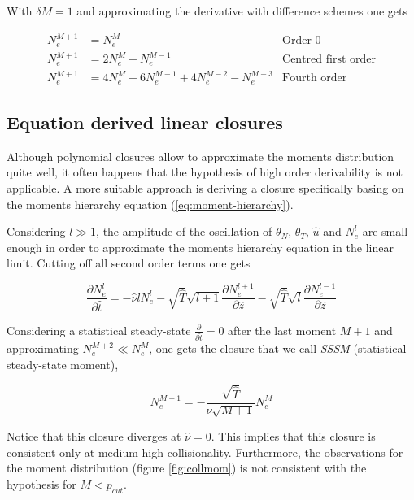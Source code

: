 \documentclass[final]{jpp}
\begin{document}
With $\delta M = 1$ and approximating the derivative with difference schemes one gets

\begin{align}
N_e^{M+1} &= N_e^M & \text{Order 0} \\
N_e^{M+1} &= 2 N_e^M - N_e^{M-1} & \text{Centred first order} \\
N_e^{M+1} &= 4 N_e^M - 6 N_e^{M-1} + 4 N_e^{M-2} - N_e^{M-3} & \text{Fourth order}
\end{align}

\subsection{Equation derived linear closures}

Although polynomial closures allow to approximate the moments distribution quite well, it often happens that the hypothesis of high order derivability is not applicable. A more suitable approach is deriving a closure specifically basing on the moments hierarchy equation (\ref{eq:moment-hierarchy}).

Considering $l \gg 1$, the amplitude of the  oscillation of $\theta_N$, $\theta_T$, $\hat{u}$ and $N_e^l$ are small enough in order to approximate the moments hierarchy equation in the linear limit. Cutting off all second order terms one gets

\begin{equation} \label{eq:linearmom}
\frac{\partial N_e^l}{\partial \hat{t}} = - \hat{\nu} l N_e^l - \sqrt{\hat{T}} \sqrt{l+1} \frac{\partial N_e^{l+1}}{\partial \hat{z}} - \sqrt{\hat{T}} \sqrt{l} \frac{\partial N_e^{l-1}}{\partial \hat{z}} 
\end{equation}

Considering a statistical steady-state $\frac{\partial}{\partial \hat{t}} = 0$ after the last moment $M+1$ and approximating $N_e^{M+2} \ll N_e^M$, one gets the closure that we call \textit{SSSM} (statistical steady-state moment),

\begin{equation} \label{eq:sssm}
N_e^{M+1} = - \frac{ \sqrt{\hat{T}} }{ \hat{\nu} \sqrt{M+1} } N_e^M 
\end{equation}

Notice that this closure diverges at $\hat{\nu} = 0$. This implies that this closure is consistent only at medium-high collisionality. Furthermore, the observations for the moment distribution (figure \ref{fig:collmom}) is not consistent with the hypothesis for $M < p_{cut}$.
\end{document}

